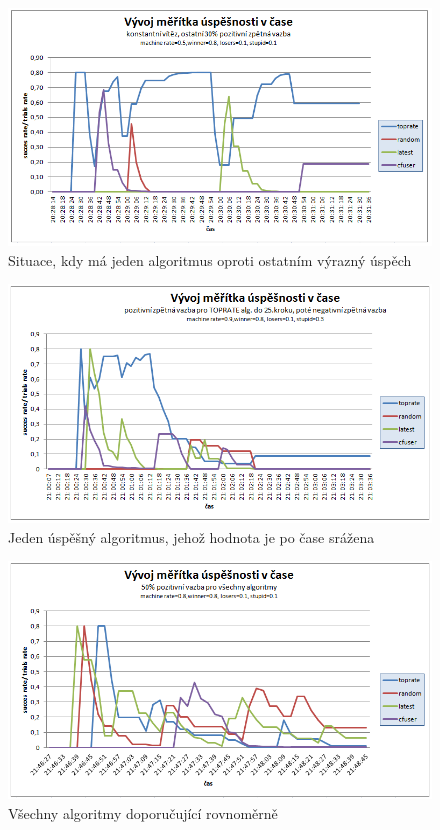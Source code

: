 \documentclass[thesis=M,czech]{FITthesis}[2014/05/07]
\begin{document}
\begin{figure}\centering
	\includegraphics[width=1.0\textwidth]{obr/experimenty/test1.png}
 	\caption[Situace, kdy má jeden algoritmus oproti ostatním výrazný úspěch]{Situace, kdy má jeden algoritmus oproti ostatním výrazný úspěch}\label{fig:test1}
\end{figure}	

\begin{figure}\centering
	\includegraphics[width=1.0\textwidth]{obr/experimenty/test5.png}
 	\caption[Jeden úspěšný algoritmus, jehož hodnota je po čase srážena]{Jeden úspěšný algoritmus, jehož hodnota je po čase srážena}\label{fig:test5}
\end{figure}	

\begin{figure}\centering
	\includegraphics[width=1.0\textwidth]{obr/experimenty/test7.png}
 	\caption[Všechny algoritmy doporučující rovnoměrně]{Všechny algoritmy doporučující rovnoměrně}\label{fig:test7}
\end{figure}	
\end{document}
